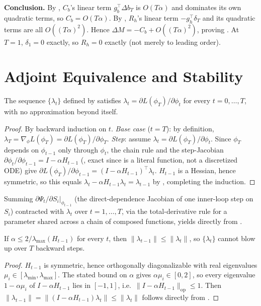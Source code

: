 \noindent\textbf{Conclusion.} By , $C_b$'s linear term $g_b^\top\Delta b_T$ is $O(T\alpha)$ and dominates its own quadratic terms, so $C_b=O(T\alpha)$. By , $R_h$'s linear term $-g_h^\top\delta_T$ and its quadratic terms are all $O((T\alpha)^2)$. Hence $\Delta M=-C_b+O((T\alpha)^2)$, proving . At $T{=}1$, $\delta_1{=}0$ exactly, so $R_h{=}0$ exactly (not merely to leading order).

\section{Adjoint Equivalence and Stability}
\label{app:adjoint}

\begin{proposition}
\label{prop:supp_exact}
The sequence $\{\lambda_t\}$ defined by  satisfies $\lambda_t=\partial L(\phi_T)/\partial\phi_t$ for every $t=0,\dots,T$, with no approximation beyond  itself.
\end{proposition}
\begin{proof}
By backward induction on $t$. \emph{Base case} ($t{=}T$): by definition, $\lambda_T=\nabla_\phi L(\phi_T)=\partial L(\phi_T)/\partial\phi_T$. \emph{Step}: assume $\lambda_t=\partial L(\phi_T)/\partial\phi_t$. Since $\phi_T$ depends on $\phi_{t-1}$ only through $\phi_t$, the chain rule and the step-Jacobian $\partial\phi_t/\partial\phi_{t-1}=I-\alpha H_{t-1}$ (, exact since  is a literal function, not a discretized ODE) give $\partial L(\phi_T)/\partial\phi_{t-1}=(I-\alpha H_{t-1})^\top\lambda_t$. $H_{t-1}$ is a Hessian, hence symmetric, so this equals $\lambda_t-\alpha H_{t-1}\lambda_t=\lambda_{t-1}$ by , completing the induction.
\end{proof}
Summing $\partial\Psi_t/\partial S_i\big|_{\phi_{t-1}}$ (the direct-dependence Jacobian of one inner-loop step on $S_i$) contracted with $\lambda_t$ over $t=1,\dots,T$, via the total-derivative rule for a parameter shared across a chain of composed functions, yields  directly from .

\begin{proposition}
\label{prop:supp_nonexpansive}
If $\alpha\le 2/\lambda_{\max}(H_{t-1})$ for every $t$, then $\|\lambda_{t-1}\|\le\|\lambda_t\|$, so $\{\lambda_t\}$ cannot blow up over $T$ backward steps.
\end{proposition}
\begin{proof}
$H_{t-1}$ is symmetric, hence orthogonally diagonalizable with real eigenvalues $\mu_i\in[\lambda_{\min},\lambda_{\max}]$. The stated bound on $\alpha$ gives $\alpha\mu_i\in[0,2]$, so every eigenvalue $1-\alpha\mu_i$ of $I-\alpha H_{t-1}$ lies in $[-1,1]$, i.e.\ $\|I-\alpha H_{t-1}\|_{\mathrm{op}}\le1$. Then $\|\lambda_{t-1}\|=\|(I-\alpha H_{t-1})\lambda_t\|\le\|\lambda_t\|$ follows directly from .
\end{proof}

